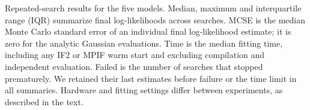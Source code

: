 \begin{table}[p]
\centering
\small

\caption{Repeated-search results for the five models.
Median, maximum and interquartile range (IQR) summarize final log-likelihoods
across searches. MCSE is the median Monte Carlo standard error of an
individual final log-likelihood estimate; it is zero for the analytic
Gaussian evaluations. Time is the median fitting time, including any IF2
or MPIF warm start and excluding compilation and independent evaluation.
Failed is the number of searches that stopped prematurely. We retained
their last estimates before failure or the time limit in all summaries.
Hardware and fitting settings differ
between experiments, as described in the text.}
\label{tab:benchmark-results}
\end{table}
